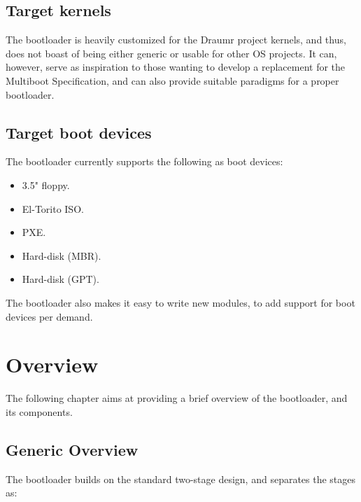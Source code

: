 \documentclass[a4paper,oneside]{memoir}
\begin{document}
\section{Target kernels}

The bootloader is heavily customized for the Draumr project kernels, and thus, does not boast of being either generic or usable for other OS projects. It can, however, serve as inspiration to those wanting to develop a replacement for the Multiboot Specification, and can also provide suitable paradigms for a proper bootloader.

\section{Target boot devices}

The bootloader currently supports the following as boot devices:

\begin{itemize}
    \item 3.5" floppy.
    \item El-Torito ISO.
    \item PXE.
    \item Hard-disk (MBR).
    \item Hard-disk (GPT).
\end{itemize}

The bootloader also makes it easy to write new modules, to add support for boot devices per demand.

\chapter{Overview}

The following chapter aims at providing a brief overview of the bootloader, and its components.

\section{Generic Overview}
\label{sec:Generic Overview}

The bootloader builds on the standard two-stage design, and separates the stages as:
\end{document}
